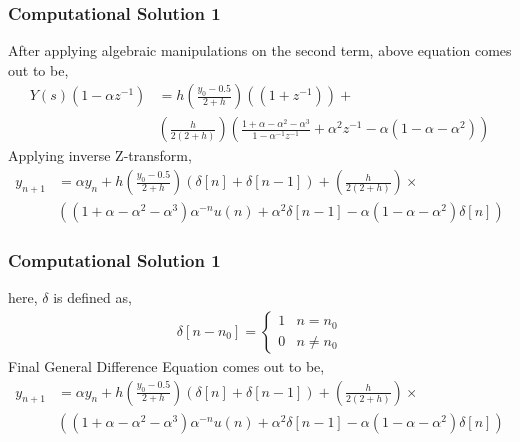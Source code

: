 \documentclass{beamer}
\providecommand{\sbrak}[1]{\ensuremath{{}\left[#1\right]}}
\providecommand{\brak}[1]{\ensuremath{\left(#1\right)}}
\theoremstyle{remark}
\numberwithin{equation}{section}
\begin{document}
		\begin{frame}
			\frametitle{Computational Solution 1}
After applying algebraic manipulations on the second term, above equation comes out to be, 
      {\small
\begin{align}
  Y\brak{s}\brak{1 - \alpha z^{-1}} &= h\brak{ \frac{y_0 - 0.5}{2+h}}\brak{\brak{1 + z^{-1}} } + \\
  &\brak{\frac{h}{2\brak{2+h}}} \brak{ \frac{1 + \alpha - \alpha^2 - \alpha^3}{1 - \alpha^{-1}z^{-1}} + \alpha^2 z^{-1} - \alpha \brak{1 - \alpha - \alpha^2} } 
\end{align}
      }
Applying inverse Z-transform,
      {\small
\begin{align}
  y_{n+1} &= \alpha y_n + h\brak{ \frac{y_0 - 0.5}{2+h}}\brak{\delta \sbrak{n} + \delta \sbrak{n-1}}+ \brak{\frac{h}{2\brak{2+h}}} \times \\
  &\brak{\brak{1 + \alpha - \alpha^2 - \alpha^3}\alpha^{-n} u \brak{n} + \alpha^2 \delta \sbrak{n-1}- \alpha \brak{1 - \alpha - \alpha^2} \delta \sbrak{n} }
\end{align}
    }\end{frame}
		\begin{frame}[fragile]
			\frametitle{Computational Solution 1}

here, $\delta$ is defined as,
      {\small
      \begin{align}
  \delta \sbrak{n-n_0} = \begin{cases}
      1 & n = n_0 \\
      0 & n \ne n_0
  \end{cases}
\end{align}
      }
Final General Difference Equation comes out to be, 
      {\small
\begin{align}
  y_{n+1} &= \alpha y_n + h\brak{ \frac{y_0 - 0.5}{2+h}}\brak{\delta \sbrak{n} + \delta \sbrak{n-1}}+ \brak{\frac{h}{2\brak{2+h}}} \times \\
  &\brak{\brak{1 + \alpha - \alpha^2 - \alpha^3}\alpha^{-n} u \brak{n} + \alpha^2 \delta \sbrak{n-1}- \alpha \brak{1 - \alpha - \alpha^2} \delta \sbrak{n} }
\end{align}
      }
		\end{frame}
\end{document}
